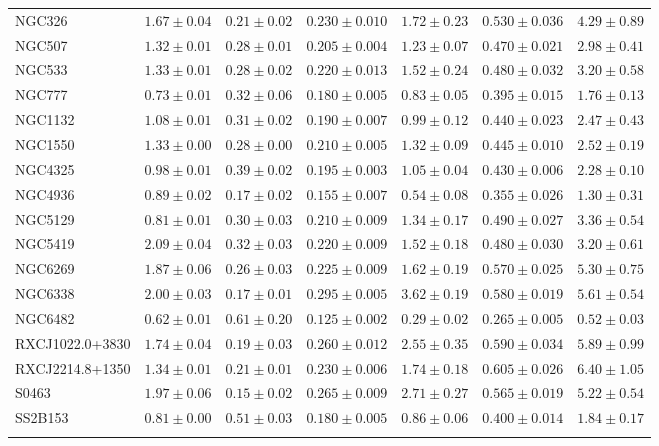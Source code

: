 \documentclass[structabstract]{aa}
\begin{document}
\begin{table}
\begin{threeparttable}
\begin{tabularx}{\textwidth}{lYYYYYY}
NGC326 & $1.67\pm0.04$ & $0.21\pm0.02$ & $0.230\pm0.010$ & $1.72\pm0.23$ & $0.530\pm0.036$ & $4.29\pm0.89$ \\ 
NGC507 & $1.32\pm0.01$ & $0.28\pm0.01$ & $0.205\pm0.004$ & $1.23\pm0.07$ & $0.470\pm0.021$ & $2.98\pm0.41$ \\ 
NGC533 & $1.33\pm0.01$ & $0.28\pm0.02$ & $0.220\pm0.013$ & $1.52\pm0.24$ & $0.480\pm0.032$ & $3.20\pm0.58$ \\ 
NGC777 & $0.73\pm0.01$ & $0.32\pm0.06$ & $0.180\pm0.005$ & $0.83\pm0.05$ & $0.395\pm0.015$ & $1.76\pm0.13$ \\ 
NGC1132 & $1.08\pm0.01$ & $0.31\pm0.02$ & $0.190\pm0.007$ & $0.99\pm0.12$ & $0.440\pm0.023$ & $2.47\pm0.43$ \\ 
NGC1550 & $1.33\pm0.00$ & $0.28\pm0.00$ & $0.210\pm0.005$ & $1.32\pm0.09$ & $0.445\pm0.010$ & $2.52\pm0.19$ \\ 
NGC4325 & $0.98\pm0.01$ & $0.39\pm0.02$ & $0.195\pm0.003$ & $1.05\pm0.04$ & $0.430\pm0.006$ & $2.28\pm0.10$ \\ 
NGC4936 & $0.89\pm0.02$ & $0.17\pm0.02$ & $0.155\pm0.007$ & $0.54\pm0.08$ & $0.355\pm0.026$ & $1.30\pm0.31$ \\ 
NGC5129 & $0.81\pm0.01$ & $0.30\pm0.03$ & $0.210\pm0.009$ & $1.34\pm0.17$ & $0.490\pm0.027$ & $3.36\pm0.54$ \\ 
NGC5419 & $2.09\pm0.04$ & $0.32\pm0.03$ & $0.220\pm0.009$ & $1.52\pm0.18$ & $0.480\pm0.030$ & $3.20\pm0.61$ \\ 
NGC6269 & $1.87\pm0.06$ & $0.26\pm0.03$ & $0.225\pm0.009$ & $1.62\pm0.19$ & $0.570\pm0.025$ & $5.30\pm0.75$ \\ 
NGC6338 & $2.00\pm0.03$ & $0.17\pm0.01$ & $0.295\pm0.005$ & $3.62\pm0.19$ & $0.580\pm0.019$ & $5.61\pm0.54$ \\ 
NGC6482 & $0.62\pm0.01$ & $0.61\pm0.20$ & $0.125\pm0.002$ & $0.29\pm0.02$ & $0.265\pm0.005$ & $0.52\pm0.03$ \\ 
RXCJ1022.0+3830 & $1.74\pm0.04$ & $0.19\pm0.03$ & $0.260\pm0.012$ & $2.55\pm0.35$ & $0.590\pm0.034$ & $5.89\pm0.99$ \\ 
RXCJ2214.8+1350 & $1.34\pm0.01$ & $0.21\pm0.01$ & $0.230\pm0.006$ & $1.74\pm0.18$ & $0.605\pm0.026$ & $6.40\pm1.05$ \\ 
S0463 & $1.97\pm0.06$ & $0.15\pm0.02$ & $0.265\pm0.009$ & $2.71\pm0.27$ & $0.565\pm0.019$ & $5.22\pm0.54$ \\ 
SS2B153 & $0.81\pm0.00$ & $0.51\pm0.03$ & $0.180\pm0.005$ & $0.86\pm0.06$ & $0.400\pm0.014$ & $1.84\pm0.17$ \\ \hline \\ \hline

\end{tabularx}
\end{threeparttable}
\end{table}
\end{document}
